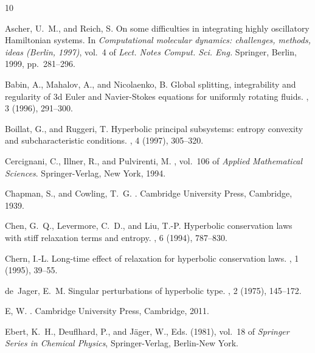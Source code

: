 \documentclass{article}
\theoremstyle{plain}%
\theoremstyle{definition}%
\theoremstyle{remark}%
\newcommand{\+}[1]{{\bm{#1}}}
\begin{document}
\begin{thebibliography}{10}

  {\sc Ascher, U.~M., and Reich, S.}
  \newblock On some difficulties in integrating highly oscillatory {H}amiltonian
    systems.
  \newblock In {\em Computational molecular dynamics: challenges, methods, ideas
    ({B}erlin, 1997)}, vol.~4 of {\em Lect. Notes Comput. Sci. Eng.} Springer,
    Berlin, 1999, pp.~281--296.
  
  {\sc Babin, A., Mahalov, A., and Nicolaenko, B.}
  \newblock Global splitting, integrability and regularity of {$3$}d {E}uler and
    {N}avier-{S}tokes equations for uniformly rotating fluids.
  , 3 (1996), 291--300.
  
  {\sc Boillat, G., and Ruggeri, T.}
  \newblock Hyperbolic principal subsystems: entropy convexity and
    subcharacteristic conditions.
  , 4 (1997), 305--320.
  
  {\sc Cercignani, C., Illner, R., and Pulvirenti, M.}
  , vol.~106 of {\em
    Applied Mathematical Sciences}.
  \newblock Springer-Verlag, New York, 1994.
  
  {\sc Chapman, S., and Cowling, T.~G.}
  .
  \newblock Cambridge University Press, Cambridge, 1939.
  
  {\sc Chen, G.~Q., Levermore, C.~D., and Liu, T.-P.}
  \newblock Hyperbolic conservation laws with stiff relaxation terms and entropy.
  , 6 (1994), 787--830.
  
  {\sc Chern, I.-L.}
  \newblock Long-time effect of relaxation for hyperbolic conservation laws.
  , 1 (1995), 39--55.
  
  {\sc de~Jager, E.~M.}
  \newblock Singular perturbations of hyperbolic type.
  , 2 (1975), 145--172.
  
  {\sc E, W.}
  .
  \newblock Cambridge University Press, Cambridge, 2011.
  
  {\sc Ebert, K.~H., Deuflhard, P., and J\"{a}ger, W.}, Eds.
   (1981), vol.~18 of
    {\em Springer Series in Chemical Physics}, Springer-Verlag, Berlin-New York.
  

\end{thebibliography}
\end{document}
